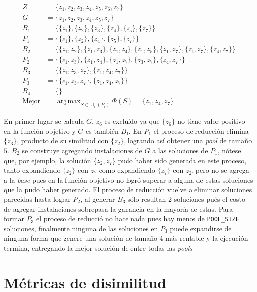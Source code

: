 \documentclass{article}
\DeclareMathOperator*{\argmax}{arg\,max}
\begin{document}
\begin{align*}
Z &= \{z_1,z_2,z_3,z_4,z_5,z_6,z_7\} \\
G &= \{z_1,z_2,z_3,z_4,z_5,z_7\} \\
B_1 &= \{\{z_1\},\{z_2\},\{z_3\},\{z_4\},\{z_5\},\{z_7\}\} \\
P_1 &= \{\{z_1\},\{z_2\},\{z_4\},\{z_5\},\{z_7\}\} \\
B_2 &= \{\{z_1,z_2\},\{z_1,z_3\},\{z_1,z_4\},\{z_1,z_5\},\{z_1,z_7\},\{z_3,z_7\},\{z_4,z_7\}\} \\
P_2 &= \{\{z_1,z_3\},\{z_1,z_4\},\{z_1,z_7\},\{z_3,z_7\},\{z_4,z_7\}\} \\
B_3 &= \{\{z_1,z_3,z_7\},\{z_1,z_4,z_7\}\} \\
P_3 &= \{\{z_1,z_3,z_7\},\{z_1,z_4,z_7\}\} \\
B_4 &= \{\} \\
\text{Mejor} &= \argmax_{S \in \cup_{i} (P_i)}\Phi(S) = \{z_1,z_4,z_7\}
\end{align*}

En primer lugar se calcula $G$, $z_6$ es excluído ya que $\{z_6\}$ no tiene valor positivo en la función objetivo y $G$ es también $B_1$.
En $P_1$ el proceso de reducción elimina $\{z_3\}$, producto de su similitud con $\{z_2\}$, logrando así obtener una \emph{pool} de tamaño $5$.
$B_2$ se construye agregando instalaciones de $G$ a las soluciones de $P_1$, nótese que, por ejemplo, la solución $\{z_2,z_7\}$ pudo haber sido generada en este proceso, tanto expandiendo $\{z_2\}$ con $z_7$ como expandiendo $\{z_7\}$ con $z_2$, pero no se agrega a la \emph{base} pues en la función objetivo no logró superar a alguna de estas soluciones que la pudo haber generado.
El proceso de reducción vuelve a eliminar soluciones parecidas hasta lograr $P_2$, al generar $B_3$ sólo resultan 2 soluciones pués el costo de agregar instalaciones sobrepasa la ganancia en la mayoría de estas. Para formar $P_3$ el proceso de reducció no hace nada pues hay menos de \texttt{POOL\_SIZE} soluciones, finalmente ninguna de las soluciones en $P_3$ puede expandirse de ninguna forma que genere una solución de tamaño 4 más rentable y la ejecución termina, entregando la mejor solución de entre todas las \emph{pools}.



\section{Métricas de disimilitud}
\label{metricas_disimilitud}
\end{document}
